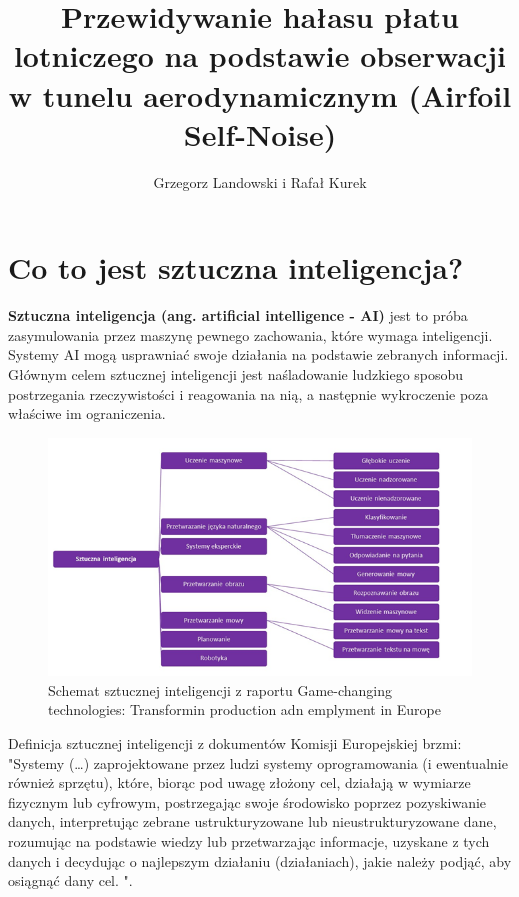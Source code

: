 \documentclass{article}
\title{Przewidywanie hałasu płatu lotniczego na podstawie obserwacji w tunelu aerodynamicznym (Airfoil Self-Noise)}
\author{Grzegorz Landowski i Rafał Kurek}
\begin{document}
\maketitle

\maketitle
\pagebreak
\tableofcontents
\pagebreak
\section{Co to jest sztuczna inteligencja?}

\textbf{Sztuczna inteligencja (ang. artificial intelligence - AI)} jest to próba zasymulowania przez maszynę pewnego zachowania, które wymaga inteligencji.\\
\break
Systemy AI mogą usprawniać swoje działania na podstawie zebranych informacji.\\
\break
Głównym celem sztucznej inteligencji jest naśladowanie ludzkiego sposobu postrzegania rzeczywistości i reagowania na nią, a następnie wykroczenie poza właściwe im ograniczenia.

\begin{figure}[h]
\caption{Schemat sztucznej inteligencji z raportu Game-changing technologies: Transformin production adn emplyment in Europe}
\includegraphics[scale=0.7]{schematsztucznejinteligencji}
\end{figure}

 Definicja sztucznej inteligencji z dokumentów Komisji Europejskiej brzmi:\\
\break
 "Systemy (…) zaprojektowane przez ludzi systemy oprogramowania (i ewentualnie również sprzętu), które, biorąc pod uwagę złożony cel, działają w wymiarze fizycznym lub cyfrowym, postrzegając swoje środowisko poprzez pozyskiwanie danych, interpretując zebrane ustrukturyzowane lub nieustrukturyzowane dane, rozumując na podstawie wiedzy lub przetwarzając informacje, uzyskane z tych danych i decydując o najlepszym działaniu (działaniach), jakie należy podjąć, aby osiągnąć dany cel. ".
\pagebreak
\end{document}
